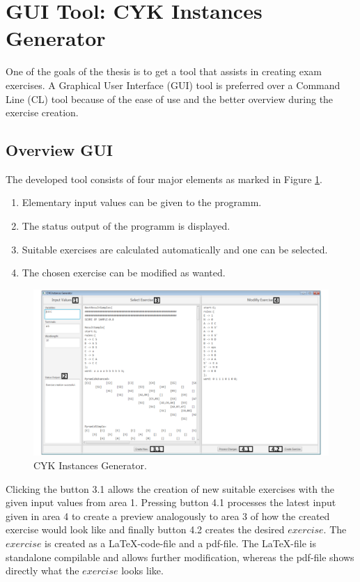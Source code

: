 
\section{GUI Tool: CYK Instances Generator }
One of the goals of the thesis is to get a tool that assists in creating exam exercises. A Graphical User Interface (GUI) tool is preferred over a Command Line (CL) tool because of the ease of use and the better overview during the exercise creation.
\subsection{Overview GUI}
The developed tool consists of four major elements as marked in Figure \ref{CYKInstancesGenerator}.
\begin{enumerate} [noitemsep]
	\item Elementary input values can be given to the programm.
	\item The status output of the programm is displayed.
	\item Suitable exercises are calculated automatically and one can be selected.
	\item The chosen exercise can be modified as wanted.
\end{enumerate}
\begin{figure}[h]
	\centering
	\includegraphics[width=\textwidth]{abb/CYKInstancesGenerator.pdf}
	\caption{CYK Instances Generator.}
	\label{CYKInstancesGenerator}
\end{figure}
Clicking the button 3.1 allows the creation of new suitable exercises with the given input values from area 1. Pressing button 4.1 processes the latest input given in area 4 to create a preview analogously to area 3 of how the created exercise would look like and finally button 4.2 creates the desired $exercise$. The $exercise$ is created as a \LaTeX-code-file and a pdf-file. The \LaTeX-file is standalone compilable and allows further modification, whereas the pdf-file shows directly what the $exercise$ looks like.
